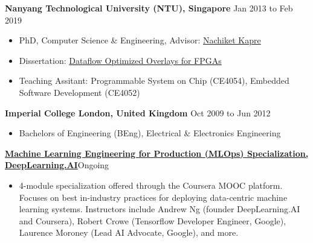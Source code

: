 \documentclass[10pt]{article}
\newenvironment{outerlist}[1][\enskip\textbullet]%
        {\begin{itemize}[#1,leftmargin=*]}{\end{itemize}%
         \vspace{-.6\baselineskip}}
\newenvironment{innerlist}[1][\enskip\textbullet]%
        {\begin{itemize}[#1,leftmargin=*,parsep=0pt,itemsep=0pt,topsep=0pt,partopsep=0pt]}
        {\end{itemize}}
\begin{document}
{
    \hspace*{-\marginparsep minus \marginparwidth}%
    \begin{minipage}[t]{\textwidth+\marginparwidth+\marginparsep}%

        {\textbf{Nanyang Technological University (NTU), Singapore}} \hfill {Jan 2013 to Feb 2019}

        \vspace{0.1in}
        \begin{innerlist}
            \item[] PhD, {Computer Science \& Engineering},
                Advisor: \href{https://nachiket.github.io/}{Nachiket Kapre}
            \item[] Dissertation: \href{https://dr.ntu.edu.sg/handle/10220/47803}{Dataflow Optimized Overlays for FPGAs}
            \item[] Teaching Assitant: Programmable System on Chip (CE4054), Embedded Software Development (CE4052)
        \end{innerlist}

        \vspace{.1in}
        {\textbf{Imperial College London, United Kingdom}} \hfill {Oct 2009 to Jun 2012}
        \begin{outerlist}
        \item[] Bachelors of Engineering (BEng), {Electrical \& Electronics Engineering}
        \end{outerlist}

        \vspace{.1in}
        {\bf \href{https://www.coursera.org/specializations/machine-learning-engineering-for-production-mlops}{Machine Learning Engineering for Production (MLOps) Specialization, DeepLearning.AI}}\hfill{Ongoing}\\[-0.1in]
        \begin{innerlist}
            \item[] 4-module specialization offered through the Coursera MOOC platform.
                Focuses on best in-industry practices for deploying data-centric machine
                learning systems. Instructors include Andrew Ng (founder DeepLearning.AI
                and Coursera), Robert Crowe (Tensorflow Developer Engineer, Google),
                Laurence Moroney (Lead AI Advocate, Google), and more.
        \end{innerlist}


\end{minipage}}
\end{document}
